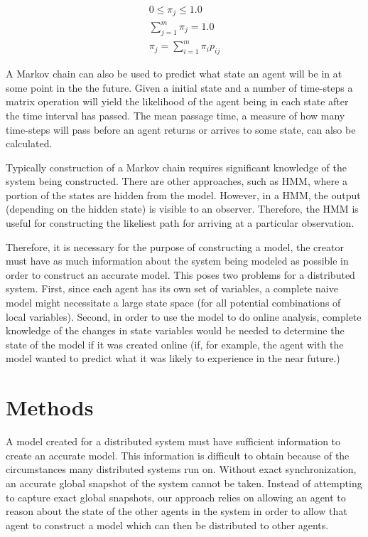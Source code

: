 \begin{align}
0\leq\pi_j\leq1.0 \\
\sum_{j = 1}^{m}\pi_j = 1.0 \\
\pi_j = \sum_{i=1}^{m} \pi_i p_{ij}
\end{align}

A Markov chain can also be used to predict what state an agent will be in at some point in the the future.
Given a initial state and a number of time-steps a matrix operation will yield the likelihood of the agent being in each state after the time interval has passed.
The mean passage time, a measure of how many time-steps will pass before an agent returns or arrives to some state, can also be calculated.

Typically construction of a Markov chain requires significant knowledge of the system being constructed. There are other approaches, such as \ac{HMM}, where a portion of the states are hidden from the model. However, in a \ac{HMM}, the output (depending on the hidden state) is visible to an observer. Therefore, the \ac{HMM} is useful for constructing the likeliest path for arriving at a particular observation.

Therefore, it is necessary for the purpose of constructing a model, the creator must have as much information about the system being modeled as possible in order to construct an accurate model. This poses two problems for a distributed system. First, since each agent has its own set of variables, a complete naive model might necessitate a large state space (for all potential combinations of local variables). Second, in order to use the model to do online analysis, complete knowledge of the changes in state variables would be needed to determine the state of the model if it was created online (if, for example, the agent with the model wanted to predict what it was likely to experience in the near future.)


\section{Methods}

A model created for a distributed system must have sufficient information to create an accurate model. This information is difficult to obtain because of the circumstances many distributed systems run on. Without exact synchronization, an accurate global snapshot of the system cannot be taken. Instead of attempting to capture exact global snapshots, our approach relies on allowing an agent to reason about the state of the other agents in the system in order to allow that agent to construct a model which can then be distributed to other agents.


